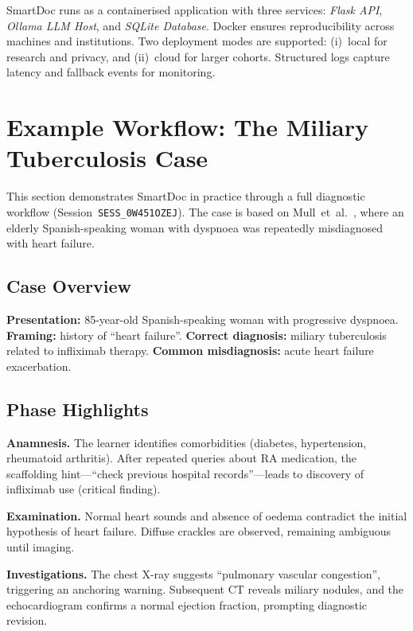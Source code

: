 SmartDoc runs as a containerised application with three services:
\textit{Flask API}, \textit{Ollama LLM Host}, and \textit{SQLite Database}.
Docker ensures reproducibility across machines and institutions.
Two deployment modes are supported:
(i)~local for research and privacy, and
(ii)~cloud for larger cohorts.
Structured logs capture latency and fallback events for monitoring.

\section{Example Workflow: The Miliary Tuberculosis Case}
\label{sec:mtb_workflow}

This section demonstrates SmartDoc in practice through a full diagnostic
workflow (Session~\texttt{SESS\_0W451OZEJ}).
The case is based on Mull~et~al.~\cite{mull_cognitive_2015}, where an elderly
Spanish-speaking woman with dyspnoea was repeatedly misdiagnosed with heart
failure.

\subsection{Case Overview}

\noindent\textbf{Presentation:} 85-year-old Spanish-speaking woman with
progressive dyspnoea.
\textbf{Framing:} history of ``heart failure''.
\textbf{Correct diagnosis:} miliary tuberculosis related to infliximab therapy.
\textbf{Common misdiagnosis:} acute heart failure exacerbation.

\subsection{Phase Highlights}

\textbf{Anamnesis.} The learner identifies comorbidities (diabetes,
hypertension, rheumatoid arthritis).
After repeated queries about RA medication, the scaffolding hint—``check previous hospital records''—leads to discovery of infliximab use (critical finding).

\textbf{Examination.} Normal heart sounds and absence of oedema contradict the
initial hypothesis of heart failure.
Diffuse crackles are observed, remaining ambiguous until imaging.

\textbf{Investigations.} The chest X-ray suggests ``pulmonary vascular
congestion'', triggering an anchoring warning.
Subsequent CT reveals miliary nodules, and the echocardiogram confirms a normal
ejection fraction, prompting diagnostic revision.

